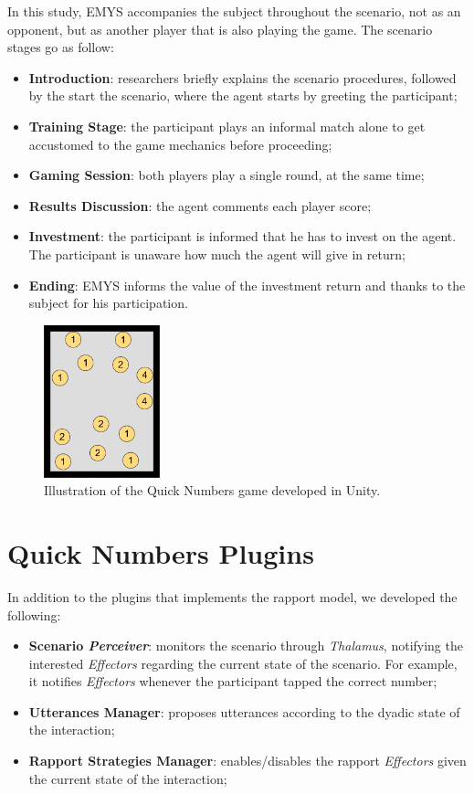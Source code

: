 In this study, \ac{EMYS} accompanies the subject throughout the scenario, not as an opponent, but as another player that is also playing the game. The scenario stages go as follow:
\begin{itemize}
	\item \textbf{Introduction}: researchers briefly explains the scenario procedures, followed by the start the scenario, where the agent starts by greeting the participant;
	\item \textbf{Training Stage}: the participant plays an informal match alone to get accustomed to the game mechanics before proceeding;
	\item \textbf{Gaming Session}: both players play a single round, at the same time;
	\item \textbf{Results Discussion}: the agent comments each player score;
	\item \textbf{Investment}: the participant is informed that he has to invest on the agent. The participant is unaware how much the agent will give in return;
	\item \textbf{Ending}: \ac{EMYS} informs the value of the investment return and thanks to the subject for his participation.	
\end{itemize}

\begin{figure}[H]
	\centering
	\includegraphics[width=0.3\textwidth]{images/FallingBoltsDiagram.png}
	\caption{Illustration of the Quick Numbers game developed in Unity.}
	\label{fig:quickNumbers}
\end{figure}

\section{Quick Numbers Plugins}

In addition to the plugins that implements the rapport model, we developed the following:
\begin{itemize}
	\item \textbf{Scenario \textit{Perceiver}}: monitors the scenario through \textit{Thalamus}, notifying the interested \textit{Effectors} regarding the current state of the scenario. For example, it notifies \textit{Effectors} whenever the participant tapped the correct number;
	\item \textbf{Utterances Manager}: proposes utterances according to the dyadic state of the interaction;
	\item \textbf{Rapport Strategies Manager}: enables/disables the rapport \textit{Effectors} given the current state of the interaction; 
\end{itemize}

